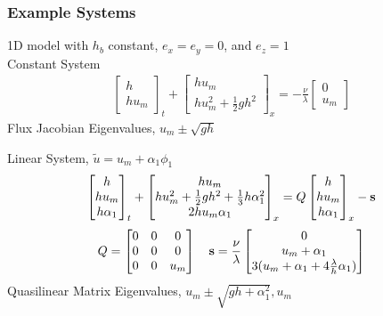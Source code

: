 \documentclass[10pt]{beamer}
\begin{document}
    \begin{frame}
      \frametitle{Example Systems}
      1D model with \(h_b\) constant, \(e_x = e_y = 0\), and \(e_z = 1\) \\
      Constant System
      \begin{align*}
        \begin{bmatrix}
          h \\
          h u_m
        \end{bmatrix}_t +
        \begin{bmatrix}
          h u_m \\
          h u_m^2 + \frac{1}{2} g h^2
        \end{bmatrix}_x =
        -\frac{\nu}{\lambda}
        \begin{bmatrix}
          0 \\
          u_m
        \end{bmatrix}
      \end{align*}
      Flux Jacobian Eigenvalues, \(u_m \pm \sqrt{gh}\)

      Linear System, \(\tilde{u} = u_m + \alpha_1 \phi_1\)
      \begin{align*}
        \begin{bmatrix}
          h \\
          hu_m \\
          h \alpha_1
        \end{bmatrix}_t +
        \begin{bmatrix}
          h u_m \\
          h u_m^2 + \frac{1}{2} gh^2 + \frac{1}{3}h \alpha_1^2 \\
          2 h u_m \alpha_1
        \end{bmatrix}_x = Q
        \begin{bmatrix}
          h \\
          hu_m \\
          h \alpha_1
        \end{bmatrix}_x - \mathbf{s}
      \end{align*}
      \begin{align*}
        Q =
        \begin{bmatrix}
          0 & 0 & 0 \\
          0 & 0 & 0 \\
          0 & 0 & u_m
        \end{bmatrix} \quad
        \mathbf{s} = \frac{\nu}{\lambda}
        \begin{bmatrix}
          0 \\
          u_m + \alpha_1 \\
          3(u_m + \alpha_1 + 4\frac{\lambda}{h} \alpha_1)
        \end{bmatrix}
      \end{align*}
      Quasilinear Matrix Eigenvalues, \(u_m \pm \sqrt{gh + \alpha_1^2}, u_m\)
    \end{frame}
\end{document}
